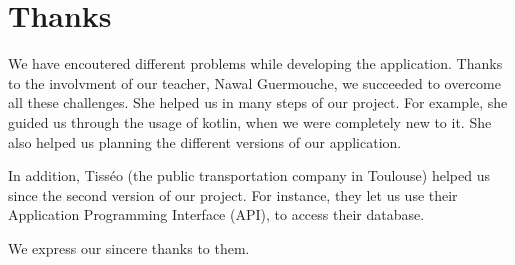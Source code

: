 \section*{Thanks}

We have encoutered different problems while developing the application. Thanks to the involvment of our teacher, Nawal Guermouche, we succeeded to overcome all these challenges. She helped us in many steps of our project. For example, she guided us through the usage of kotlin, when we were completely new to it. She also helped us planning the different versions of our application.


In addition, Tisséo (the public transportation company in Toulouse) helped us since the second version of our project. For instance, they let us use their Application Programming Interface (API)\cite{tisseo}, to access their database.


We express our sincere thanks to them.

